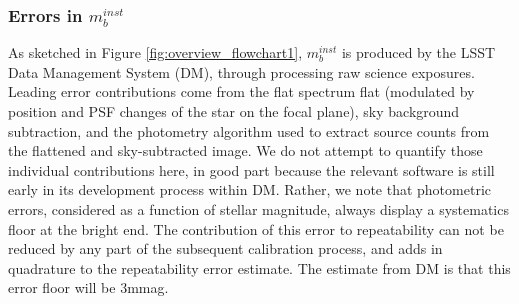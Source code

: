 \documentclass[12pt,preprint]{aastex}
\begin{document}
\subsubsection{Errors in $m_b^{inst}$}
As sketched in Figure \ref{fig:overview_flowchart1}, $m_b^{inst}$ is produced by the LSST Data Management System (DM), through processing raw science exposures. Leading error contributions come from the flat spectrum flat (modulated by position and PSF
changes of the star on the focal plane), sky background subtraction, and the photometry algorithm used to extract source counts from the flattened and sky-subtracted image. We do not attempt to quantify those individual contributions here, in good part because the relevant software is still early in its development process within DM. Rather, we note that photometric errors, considered as a function of stellar magnitude, always display a systematics floor at the bright end. The contribution of this error to repeatability can not be reduced by any part of the subsequent calibration process, and adds in quadrature to the repeatability error estimate. The estimate from DM is that this error floor will be 3mmag. 
\end{document}
